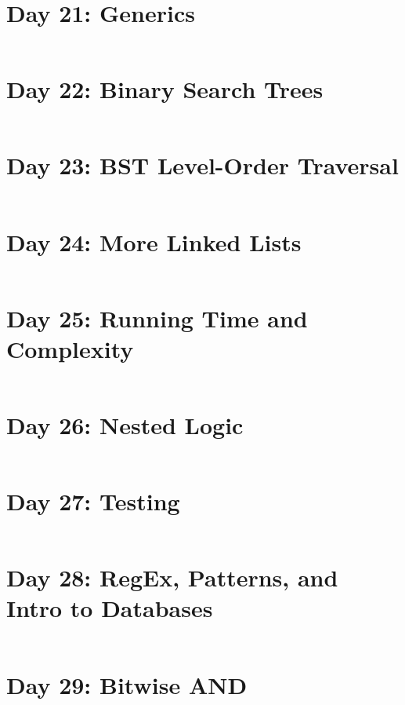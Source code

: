 \documentclass[11pt,a4paper]{article}
\begin{document}
\newpage
\section{Day 21: Generics}
\begin{lstlisting}
\end{lstlisting}

\newpage
\section{Day 22: Binary Search Trees}
\begin{lstlisting}
\end{lstlisting}

\newpage
\section{Day 23: BST Level-Order Traversal}
\begin{lstlisting}
\end{lstlisting}

\newpage
\section{Day 24: More Linked Lists}
\begin{lstlisting}
\end{lstlisting}

\newpage
\section{Day 25: Running Time and Complexity}
\begin{lstlisting}
\end{lstlisting}

\newpage
\section{Day 26: Nested Logic}
\begin{lstlisting}
\end{lstlisting}

\newpage
\section{Day 27: Testing}
\begin{lstlisting}
\end{lstlisting}

\newpage
\section{Day 28: RegEx, Patterns, and Intro to Databases}
\begin{lstlisting}
\end{lstlisting}

\newpage
\section{Day 29: Bitwise AND}
\begin{lstlisting}
\end{lstlisting}
\end{document}
